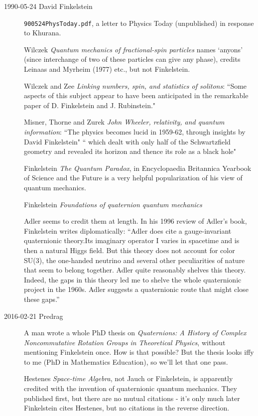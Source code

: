 \begin{description}
\item[1990-05-24 David Finkelstein] \texttt{900524PhysToday.pdf}, a
letter to Physics Today (unpublished) in response to Khurana.

Wilczek {\em Quantum mechanics of fractional-spin
particles} names `anyons' (since interchange of two of these particles
can give any phase), credits  Leinaas and Myrheim (1977) etc., but not
Finkelstein.

Wilczek and Zee
{\em Linking numbers, spin, and statistics of solitons}:
``Some aspects of this subject appear to have been anticipated in the
remarkable paper of D. Finkelstein and J. Rubinstein."

Misner, Thorne and Zurek
{\em {John Wheeler}, relativity, and quantum information}:
``The physics becomes lucid in 1959-62, through insights by David
Finkelstein"
`` which dealt with only half of the Schwartzfield geometry and revealed
its horizon and thence its role as a black hole"

Finkelstein {\em The Quantum Paradox},
in {Encyclopaedia Britannica} {Yearbook of Science and the Future}
is a very helpful popularization of his view of quantum mechanics.

Finkelstein \etal{}
{\em Foundations of quaternion quantum mechanics}

Adler seems to credit them at length. In his 1996 review of
Adler's book, Finkelstein writes diplomatically: ``Adler
does cite a gauge-invariant quaternionic theory.Its imaginary operator
I varies in spacetime and is then a natural Higgs field. But this
theory does not account for color SU(3), the one-handed neutrino and
several other peculiarities of nature that seem to belong together.
Adler quite reasonably shelves this theory. Indeed, the gaps in this
theory led me to shelve the whole quaternionic project in the 1960s.
Adler suggests a quaternionic route that might close these gaps.''

\item[2016-02-21 Predrag]
A man wrote a whole PhD thesis
    on {\em Quaternions: A History of Complex Noncommutative Rotation
    Groups in Theoretical Physics}, without mentioning  Finkelstein
    \etal{} once. How is that possible? But the
    thesis looks iffy to me (PhD in Mathematics Education), so we'll
    let that one pass.

Hestenes {\em Space-time Algebra}, not Jauch or
Finkelstein, is apparently credited with the
invention of quaternionic quantum mechanics. They published first, but
there are no mutual citations - it's only much later Finkelstein cites
Hestenes, but no citations in the reverse direction.


\end{description}
